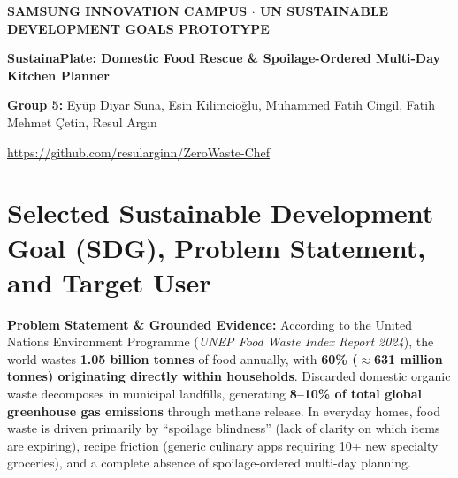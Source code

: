 \documentclass[9pt,a4paper]{article}
\begin{document}
\begin{tcolorbox}[
  enhanced,
  colback=undpblue,
  colframe=undpblue,
  arc=5pt,
  boxrule=0pt,
  left=8pt, right=8pt, top=5pt, bottom=5pt
]
  \begin{minipage}[c]{0.72\textwidth}
    {\fontsize{7.2}{8.8}\selectfont\bfseries\color{white!85!yellow} SAMSUNG INNOVATION CAMPUS $\cdot$ UN SUSTAINABLE DEVELOPMENT GOALS PROTOTYPE\par}\vspace{2pt}
    {\fontsize{13}{15.5}\selectfont\bfseries\color{white} SustainaPlate: Domestic Food Rescue \& Spoilage-Ordered Multi-Day Kitchen Planner\par}\vspace{2.5pt}
    {\fontsize{7.8}{9.5}\selectfont\color{white!92} \textbf{Group 5:} Eyüp Diyar Suna, Esin Kilimcioğlu, Muhammed Fatih Cingil, Fatih Mehmet Çetin, Resul Argın\par}
  \end{minipage}%
  \hfill
  \begin{minipage}[c]{0.26\textwidth}
    \raggedleft
    \leavevmode{}\par\vspace{1.5pt}
    \leavevmode{}\par\vspace{1.5pt}
    {\fontsize{6.8}{8}\selectfont\color{white!90} \url{https://github.com/resularginn/ZeroWaste-Chef}\par}
  \end{minipage}
\end{tcolorbox}
\vspace{-5pt}

\section{Selected Sustainable Development Goal (SDG), Problem Statement, and Target User}
\textbf{Problem Statement \& Grounded Evidence:} According to the United Nations Environment Programme (\emph{UNEP Food Waste Index Report 2024}), the world wastes \textbf{1.05 billion tonnes} of food annually, with \textbf{60\% ($\approx$631 million tonnes) originating directly within households}. Discarded domestic organic waste decomposes in municipal landfills, generating \textbf{8--10\% of total global greenhouse gas emissions} through methane release. In everyday homes, food waste is driven primarily by ``spoilage blindness'' (lack of clarity on which items are expiring), recipe friction (generic culinary apps requiring 10+ new specialty groceries), and a complete absence of spoilage-ordered multi-day planning.
\end{document}
